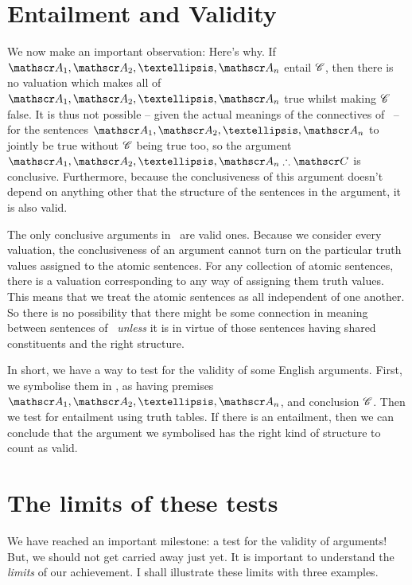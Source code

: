 \section{Entailment and Validity} \label{s:entailvalid}

We now make an important observation:
Here's why. If $\meta{A}_1, \meta{A}_2, …, \meta{A}_n$ entail $\mathscr{C}$, then there is no valuation which makes all of $\meta{A}_1, \meta{A}_2, …, \meta{A}_n$ true whilst making $\mathscr{C}$ false. It is thus not possible – given the actual meanings of the connectives of \TFL\ – for the sentences $\meta{A}_1, \meta{A}_2, …, \meta{A}_n$ to jointly be true without $\mathscr{C}$ being true too, so the argument $\meta{A}_1, \meta{A}_2, …, \meta{A}_n\ttherefore \meta{C}$ is conclusive. Furthermore, because the conclusiveness of this argument doesn't depend on anything other that the structure of the sentences in the argument, it is also valid. 

The only conclusive arguments in \TFL\ are valid ones. Because we consider every valuation, the conclusiveness of an argument cannot turn on the particular truth values assigned to the  atomic sentences. For any collection of atomic sentences, there is a valuation corresponding to any way of assigning them truth values. This means that we treat the atomic sentences as all independent of one another. So there is no possibility that there might be some connection in meaning between sentences of \TFL\ \emph{unless} it is in virtue of those sentences having shared constituents and the right structure.   

In short, we have a way to test for the validity of some English arguments. First, we symbolise them in \TFL, as having premises $\meta{A}_1, \meta{A}_2, …, \meta{A}_n$, and conclusion $\mathscr{C}$. Then we test for entailment using truth tables. If there is an entailment, then we can conclude that the argument we symbolised has the right kind of structure to count as valid.


\section{The limits of these tests}\label{s:ParadoxesOfMaterialConditional}
We have reached an important milestone: a test for the validity of arguments! But, we should not get carried away just yet. It is important to understand the \emph{limits} of our achievement. I shall illustrate these limits with three examples.

